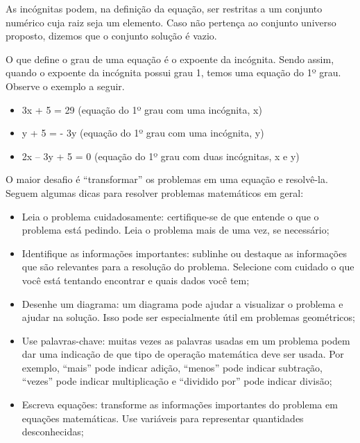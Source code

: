 \begin{escolha}
\begin{boxmedio}
\begin{boxmedio}
{\begin{boxpeq}
\begin{boxpeq}
{\begin{boxpeq}
\begin{boxmedio}
\begin{boxmedio}
\begin{boxpeq}
\begin{boxmedio}
\begin{boxpeq}
\begin{boxpeq}
\begin{boxpeq}
\begin{boxpeq}
{As incógnitas podem, na definição da equação, ser restritas a um
conjunto numérico cuja raiz seja um elemento. Caso não pertença ao
conjunto universo proposto, dizemos que o conjunto solução é vazio.

O que define o grau de uma equação é o expoente da incógnita. Sendo
assim, quando o expoente da incógnita possui grau 1, temos uma equação
do 1º grau. Observe o exemplo a seguir. 

\begin{itemize}
  
  \item 3x + 5 = 29 (equação do 1º grau com uma incógnita, x)
  
  \item y + 5 = - 3y (equação do 1º grau com uma incógnita, y)
  
  \item 2x -- 3y + 5 = 0 (equação do 1º grau com duas incógnitas, x e y)

\end{itemize}

O maior desafio é ``transformar'' os problemas em uma equação e
resolvê-la. Seguem algumas dicas para resolver problemas
matemáticos em geral:

\begin{itemize}
  \item Leia o problema cuidadosamente: certifique-se de que entende o que
o problema está pedindo. Leia o problema mais de uma vez, se necessário;

  \item Identifique as informações importantes: sublinhe ou destaque as
informações que são relevantes para a resolução do problema. Selecione com
cuidado o que você está tentando encontrar e quais dados você tem;

  \item Desenhe um diagrama: um diagrama pode ajudar a visualizar o
problema e ajudar na solução. Isso pode ser especialmente útil em
problemas geométricos;

  \item Use palavras-chave: muitas vezes as palavras usadas em um
problema podem dar uma indicação de que tipo de operação matemática deve
ser usada. Por exemplo, ``mais'' pode indicar adição, ``menos'' pode
indicar subtração, ``vezes'' pode indicar multiplicação e
``dividido por'' pode indicar divisão;

  \item Escreva equações: transforme as informações importantes do
problema em equações matemáticas. Use variáveis para representar
quantidades desconhecidas;


\end{itemize}}
\end{boxpeq}
\end{boxpeq}
\end{boxpeq}
\end{boxpeq}
\end{boxmedio}
\end{boxpeq}
\end{boxmedio}
\end{boxmedio}
\end{boxpeq}}
\end{boxpeq}
\end{boxpeq}}
\end{boxmedio}
\end{boxmedio}
\end{escolha}
